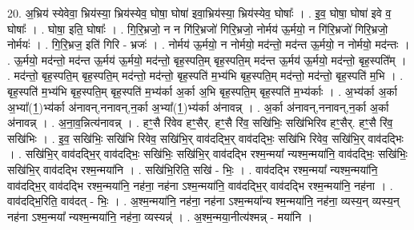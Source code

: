 \documentclass[17pt]{extarticle}
\begin{document}
20. अ॒भ्रिय॑ स्येवेवा॒ भ्रिय॑स्या॒ भ्रिय॑स्येव॒ घोषा॒ घोषा॑ इवा॒भ्रिय॑स्या॒ भ्रिय॑स्येव॒ घोषाः᳚ । . इ॒व॒ घोषा॒ घोषा॑ इवे व॒ घोषाः᳚ । . घोषा॒ इति॒ घोषाः᳚ । . गि॒रि॒भ्रजो॒ न न गि॑रि॒भ्रजो॑ गिरि॒भ्रजो॒ नोर्मय॑ ऊ॒र्मयो॒ न गि॑रि॒भ्रजो॑ गिरि॒भ्रजो॒ नोर्मयः॑ । . गि॒रि॒भ्रज॒ इति॑ गिरि - भ्रजः॑ । . नोर्मय॑ ऊ॒र्मयो॒ न नोर्मयो॒ मद॑न्तो॒ मद॑न्त ऊ॒र्मयो॒ न नोर्मयो॒ मद॑न्तः । . ऊ॒र्मयो॒ मद॑न्तो॒ मद॑न्त ऊ॒र्मय॑ ऊ॒र्मयो॒ मद॑न्तो॒ बृह॒स्पति॒म् बृह॒स्पति॒म् मद॑न्त ऊ॒र्मय॑ ऊ॒र्मयो॒ मद॑न्तो॒ बृह॒स्पति᳚म् । . मद॑न्तो॒ बृह॒स्पति॒म् बृह॒स्पति॒म् मद॑न्तो॒ मद॑न्तो॒ बृह॒स्पति॑ म॒भ्य॑भि बृह॒स्पति॒म् मद॑न्तो॒ 
मद॑न्तो॒ बृह॒स्पति॑ म॒भि । . बृह॒स्पति॑ म॒भ्य॑भि बृह॒स्पति॒म् बृह॒स्पति॑ म॒भ्य॑र्का अ॒र्का अ॒भि बृह॒स्पति॒म् बृह॒स्पति॑ म॒भ्य॑र्काः । . अ॒भ्य॑र्का अ॒र्का अ॒भ्या᳚(1॒)भ्य॑र्का अ॑नावन्,ननावन्,न॒र्का अ॒भ्या᳚(1॒)भ्य॑र्का अ॑नावन्न् । . अ॒र्का अ॑नावन्,ननावन्,न॒र्का अ॒र्का अ॑नावन्न् । . अ॒ना॒व॒न्नित्य॑नावन्न् । . हꣳ॒॒सै रि॑वेव हꣳ॒॒सैर्. हꣳ॒॒सै रि॑व॒ सखि॑भिः॒ सखि॑भिरिव हꣳ॒॒सैर्. हꣳ॒॒सै रि॑व॒ सखि॑भिः । . इ॒व॒ सखि॑भिः॒ सखि॑भि रिवेव॒ सखि॑भि॒र् वाव॑दद्भि॒र् वाव॑दद्भिः॒ सखि॑भि रिवेव॒ सखि॑भि॒र् वाव॑दद्भिः । . सखि॑भि॒र् वाव॑दद्भि॒र् वाव॑दद्भिः॒ सखि॑भिः॒ सखि॑भि॒र् वाव॑दद्भि रश्म॒न्मया᳚ न्यश्म॒न्मया॑नि॒ वाव॑दद्भिः॒ सखि॑भिः॒ सखि॑भि॒र् वाव॑दद्भि रश्म॒न्मया॑नि । . सखि॑भि॒रिति॒ सखि॑ - भिः॒ । . वाव॑दद्भि रश्म॒न्मया᳚ न्यश्म॒न्मया॑नि॒ वाव॑दद्भि॒र् वाव॑दद्भि रश्म॒न्मया॑नि॒ नह॑ना॒ नह॑ना ऽश्म॒न्मया॑नि॒ वाव॑दद्भि॒र् वाव॑दद्भि रश्म॒न्मया॑नि॒ नह॑ना । . वाव॑दद्भि॒रिति॒ वाव॑दत् - भिः॒ । . अ॒श्म॒न्मया॑नि॒ नह॑ना॒ नह॑ना ऽश्म॒न्मया᳚न्य श्म॒न्मया॑नि॒ नह॑ना॒ व्यस्य॒न् व्यस्य॒न् नह॑ना ऽश्म॒न्मया᳚ न्यश्म॒न्मया॑नि॒ नह॑ना॒ व्यस्यन्न्॑ । . अ॒श्म॒न्मया॒नीत्य॑श्मन्न् - मया॑नि । \newline
\end{document}
